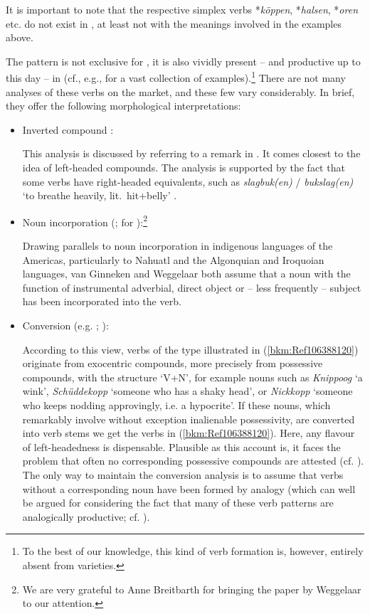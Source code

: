 \documentclass[output=paper
  ,nobabel
  ,draftmode
  ,colorlinks, citecolor=brown
]{langscibook}
\begin{document}
\noindent
It is important to note that the respective simplex verbs *\emph{köppen}, *\emph{halsen},
*\emph{oren} etc. do not exist in , at least not with the meanings involved in the
examples above.

The pattern is not exclusive for , it is also vividly present – and productive up to this
day – in  (cf., e.g., \citealt{AsdahlHolmberg1973} for a vast collection of
examples).\footnote{To the best of our knowledge, this kind of verb formation is, however, entirely
  absent from  varieties.} There are not many analyses of these verbs on the market, and
these few vary considerably. In brief, they offer the following morphological interpretations:


\begin{itemize}
\item Inverted compound \citep{Henzen1965}:

This analysis is discussed by \citet[55--56]{AsdahlHolmberg1973} referring to a remark in
. It comes closest to the idea of left-headed compounds. The
analysis is supported by the fact that some verbs have right-headed equivalents, such as
\emph{slagbuk(en)} / \emph{bukslag(en)} `to breathe heavily, lit.\ hit+belly' \citep[53, 56]{AsdahlHolmberg1973}.

\item Noun incorporation (\citealt[Section~2]{vanGinneken1939}; \citealt{Weggelaar1986} for ):\footnote{We are very grateful to Anne Breitbarth for bringing the paper by Weggelaar to our attention.}

Drawing parallels to noun incorporation in indigenous languages of the Americas, particularly to Nahuatl and the Algonquian and Iroquoian languages, van Ginneken and Weggelaar both assume that a noun with the function of instrumental adverbial, direct object or – less frequently – subject has been incorporated into the verb. 

\item Conversion (e.g. \citealt[32--37]{Weise1920}; \citealt{AsdahlHolmberg1973}):

According to this view, verbs of the type illustrated in (\ref{bkm:Ref106388120}) originate from exocentric compounds, more precisely from possessive compounds, with the structure `V+N', for example nouns such as \emph{Knippoog} `a wink', \emph{Schüddekopp} `someone who has a shaky head', or \emph{Nickkopp} `someone who keeps nodding approvingly, i.e. a hypocrite'. If these nouns, which remarkably involve without exception inalienable possessivity, are converted into verb stems we get the verbs in (\ref{bkm:Ref106388120}). Here, any flavour of left-headedness is dispensable. Plausible as this account is, it faces the problem that often no corresponding possessive compounds are attested (cf. \citealt[304]{Weggelaar1986}). The only way to maintain the conversion analysis is to assume that verbs without a corresponding noun have been formed by analogy (which can well be argued for considering the fact that many of these verb patterns are analogically productive; cf. \citealt{AsdahlHolmberg1973}).

\end{itemize}
\end{document}
